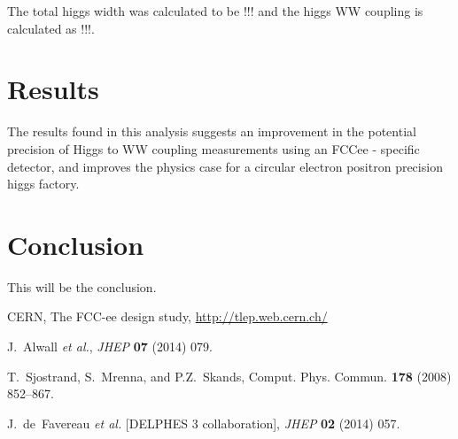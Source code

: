 \documentclass[preprintnumbers,nofootinbib,noshowpacs,eqsecnum,prd,superscriptaddress,letterpaper]{revtex4}
\begin{document}
The total higgs width was calculated to be !!! and the higgs WW coupling is calculated as !!!.

\section{Results}
\label{sec:results}

The results found in this analysis suggests an improvement in the potential precision of Higgs to WW coupling measurements using an FCCee - specific detector, and improves the physics case for a circular electron positron precision higgs factory. 

\section{Conclusion}
\label{sec:conclusion}


This will be the conclusion.

\clearpage

\begin{thebibliography}{99}

   CERN, The FCC-ee design study, \url{http://tlep.web.cern.ch/}
  
   J.~Alwall {\it et al.},
   {\it JHEP} {\bf 07} (2014) 079.
  
   T.~Sjostrand, S.~Mrenna, and P.Z.~Skands,
   Comput. Phys. Commun. {\bf 178} (2008) 852–867.
 
   J.~de~Favereau {\it et al.} [DELPHES 3 collaboration],
   {\it JHEP} {\bf 02} (2014) 057.
  

\end{thebibliography}
\end{document}

